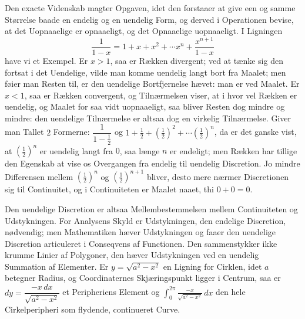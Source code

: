 \documentclass[12pt]{book}
\newcommand{\apage}[1]{\marginnote{\footnotesize\textit{[#1]}}}
\begin{document}
Den exacte Videnskab magter Opgaven, idet den forstaaer at give een og
samme Størrelse baade en endelig og en uendelig Form, og derved i
Operationen bevise, at det Uopnaaelige er opnaaeligt, og det Opnaaelige
uopnaaeligt. I Ligningen
\[
  \frac{1}{1-x} = 1 + x + x^2 + \cdots x^n + \frac{x^{n+1}}{1-x}
\]
have vi et Exempel. Er $x > 1$, saa er Rækken divergent; ved at tænke sig
den fortsat i det Uendelige, vilde man komme uendelig langt bort fra
Maalet; men føier man Resten til, er den uendelige Bortfjernelse hævet: man
er ved Maalet. Er $x < 1$, saa er Rækken convergent, og Tilnærmelsen viser,
at i hvor vel Rækken er uendelig, og Maalet for saa vidt uopnaaeligt, saa
bliver Resten dog mindre og mindre: den uendelige Tilnærmelse er altsaa dog
en virkelig Tilnærmelse. Giver man Tallet $2$ Formerne: $\dfrac{1}{1-\frac12}$
og $1 + \frac12 + \left(\tfrac12\right)^2 + \cdots \left(\tfrac12\right)^n$,
da er det ganske vist, at $\left(\tfrac12\right)^n$ er uendelig langt fra
$0$, saa længe $n$ er endeligt; men Rækken har tillige den Egenskab at vise
os Overgangen fra endelig til uendelig Discretion. Jo mindre Differensen
mellem $\left(\tfrac12\right)^n$ og $\left(\tfrac12\right)^{n+1}$ bliver,
desto mere nærmer Discretionen sig til Continuitet, og i Continuiteten er
Maalet naaet, thi $0 + 0 = 0$.

\apage{124} Den uendelige Discretion er altsaa Mellembestemmelsen mellem Continuiteten
og Udstykningen. For Analysens Skyld er Udstykningen, den endelige
Discretion, nødvendig; men Mathematiken hæver Udstykningen og faaer den
uendelige Discretion articuleret i Conseqvens af Functionen. Den
sammenstykker ikke krumme Linier af Polygoner, den hæver Udstykningen ved
en uendelig Summation af Elementer. Er $y = \sqrt{a^2 - x^2}$ en Ligning
for Cirklen, idet $a$ betegner Radius, og Coordinaternes Skjæringspunkt
ligger i Centrum, saa er $dy = \dfrac{-x\,dx}{\sqrt{a^2 - x^2}}$ et
Peripheriens Element og $\displaystyle\int_0^{2\pi} \frac{-x}{\sqrt{a^2 -
x^2}}\,dx$ den hele Cirkelperipheri som flydende, continueret Curve.
\end{document}
